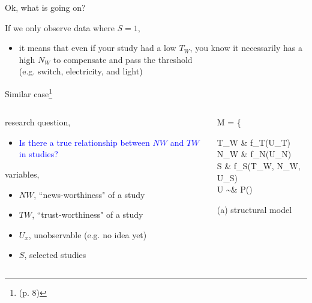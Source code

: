 %
%
\begin{lhframe}[rhgraphic={\texttt{[image: collider1\_triptych.pdf]}}]
	{Ok, what is going on?}
	
	If we only observe data where $S=1$,
	\begin{itemize}
		\item it means that even if your study had a low $T_{W}$, you know it necessarily has a high $N_{W}$ to compensate and pass the threshold \\
		{\small (e.g. switch, electricity, and light)}
	\end{itemize}
\end{lhframe}
%
%
\begin{frame}
	{Similar case\footnote{\citet{Cinelli_et_al_2021} (p. 8)}}
	\begin{columns}
		\begin{column}{0.5\textwidth}
			
			research question, 
			\begin{itemize}
				\item \textcolor{blue}{Is there a true relationship between $NW$ and $TW$ in studies?}
			\end{itemize}
			
			variables,
			\begin{itemize}
				\item $NW$, ``news-worthiness" of a study 
				\item $TW$, ``trust-worthiness" of a study 
				\item $U_{x}$, unobservable (e.g. no idea yet)
				\item $S$, selected studies
			\end{itemize}
		\end{column}
		\begin{column}{0.5\textwidth}  
			\begin{equ}
				M = \left\{ \begin{aligned} 
					T_{W} \leftarrow & \; f_{T}(U_{T}) \\
					N_{W} \leftarrow & \; f_{N}(U_{N}) \\
					S \leftarrow & \; f_{S}(T_{W}, N_{W}, U_{S}) \\
					U \sim & \; P()
				\end{aligned} \right
				\caption*{(a) structural model}
			\end{equ}
			\begin{figure}
\end{figure}
\end{column}
\end{columns}
\end{frame}
